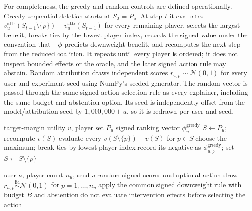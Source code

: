 \documentclass[pdflatex,sn-mathphys-num]{sn-jnl}
\begin{document}
For completeness, the greedy and random controls are defined operationally. Greedy sequential deletion starts at $S_0=P_u$. At step $t$ it evaluates $v_u^{\mathrm{attr}}(S_{t-1}\setminus\{p\})-v_u^{\mathrm{attr}}(S_{t-1})$ for every remaining player, selects the largest benefit, breaks ties by the lowest player index, records the signed value under the convention that $-\phi$ predicts downweight benefit, and recomputes the next step from the reduced coalition. It repeats until every player is ordered; it does not inspect bounded effects or the oracle, and the later signed action rule may abstain. Random attribution draws independent scores $r_{u,p}\sim\mathcal{N}(0,1)$ for every user and experiment seed using NumPy's seeded generator. The random vector is passed through the same signed action-selection rule as every explainer, including the same budget and abstention option. Its seed is independently offset from the model/attribution seed by $1{,}000{,}000+u$, so it is redrawn per user and seed.

\begin{algorithm}[t]
\caption{Greedy sequential-deletion baseline}
\label{alg:greedy-baseline}
\begin{algorithmic}[1]
\Require target-margin utility $v$, player set $P_u$
\Ensure signed ranking vector $\phi^{\mathrm{greedy}}_u$
\State $S\gets P_u$; recompute $v(S)$
  \State evaluate every $v(S\setminus\{p\})-v(S)$ for $p\in S$
  \State choose the maximum; break ties by lowest player index
  \State record its negative as $\phi^{\mathrm{greedy}}_{u,p}$; set $S\gets S\setminus\{p\}$
\EndWhile
\end{algorithmic}
\end{algorithm}

\begin{algorithm}[t]
\caption{Random attribution negative control}
\label{alg:random-baseline}
\begin{algorithmic}[1]
\Require user $u$, player count $n_u$, seed $s$
\Ensure random signed scores and optional action
\State draw $r_{u,p}\overset{\mathrm{iid}}{\sim}\mathcal{N}(0,1)$ for $p=1,\ldots,n_u$
\State apply the common signed downweight rule with budget $B$ and abstention
\State do not evaluate intervention effects before selecting the action
\end{algorithmic}
\end{algorithm}
\end{document}
